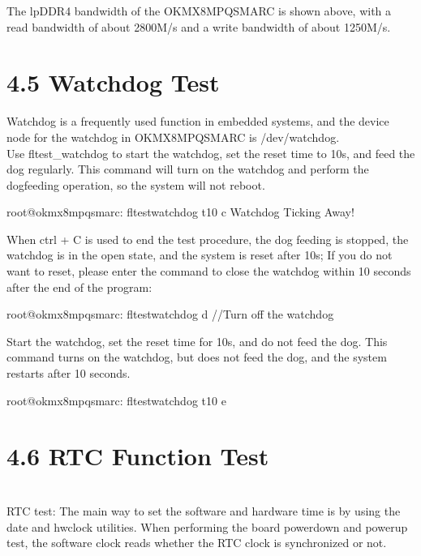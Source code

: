 \documentclass[letterpaper,10pt,openany,english]{sphinxmanual}
\begin{document}
\sphinxAtStartPar
The lpDDR4 bandwidth of the OK\sphinxhyphen{}MX8MPQ\sphinxhyphen{}SMARC is shown above, with a read bandwidth of about 2800M/s and a write bandwidth of about 1250M/s.


\section{4.5 Watchdog Test}
\label{\detokenize{linux-manual:id2}}
\sphinxAtStartPar
Watchdog is a frequently used function in embedded systems, and the device node for the watchdog in OK\sphinxhyphen{}MX8MPQ\sphinxhyphen{}SMARC is /dev/watchdog.\\
Use fltest\_watchdog to start the watchdog, set the reset time to 10s, and feed the dog regularly. This command will turn on the watchdog and perform the dog\sphinxhyphen{}feeding operation, so the system will not reboot.

\begin{sphinxVerbatim}[commandchars=\\\{\}]
root@ok\PYGZhy{}mx8mpq\PYGZhy{}smarc:\PYGZti{}\PYGZsh{} fltest\PYGZus{}watchdog \PYGZhy{}t10 \PYGZhy{}c
Watchdog Ticking Away!
\end{sphinxVerbatim}

\sphinxAtStartPar
When ctrl + C is used to end the test procedure, the dog feeding is stopped, the watchdog is in the open state, and the system is reset after 10s; If you do not want to reset, please enter the command to close the watchdog within 10 seconds after the end of the program:

\begin{sphinxVerbatim}[commandchars=\\\{\}]
root@ok\PYGZhy{}mx8mpq\PYGZhy{}smarc:\PYGZti{}\PYGZsh{} fltest\PYGZus{}watchdog \PYGZhy{}d                      //Turn off the watchdog
\end{sphinxVerbatim}

\sphinxAtStartPar
Start the watchdog, set the reset time for 10s, and do not feed the dog. This command turns on the watchdog, but does not feed the dog, and the system restarts after 10 seconds.

\begin{sphinxVerbatim}[commandchars=\\\{\}]
root@ok\PYGZhy{}mx8mpq\PYGZhy{}smarc:\PYGZti{}\PYGZsh{} fltest\PYGZus{}watchdog \PYGZhy{}t10 \PYGZhy{}e
\end{sphinxVerbatim}


\section{4.6 RTC Function Test}
\label{\detokenize{linux-manual:rtc-function-test}}
\sphinxAtStartPar
{}\\
RTC test: The main way to set the software and hardware time is by using the date and hwclock utilities. When performing the board power\sphinxhyphen{}down and power\sphinxhyphen{}up test, the software clock reads whether the RTC clock is synchronized or not.
\end{document}
